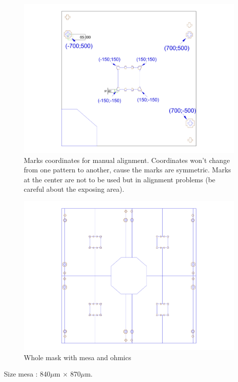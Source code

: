 \documentclass[12pt,a4paper]{report}
\begin{document}
\begin{enumerate}
\begin{figure} [h] \centering
\includegraphics[scale=0.6]{fig/DD_Dots_V6_with_coord.pdf}
\caption{Marks coordinates for manual alignment. Coordinates won't change from one pattern to another, cause 
the marks are symmetric. Marks at the center are not to be used but in alignment problems (be careful about the exposing area).} \label{align1}
\end{figure}

\newpage

\begin{figure} [ht] \centering
\includegraphics[scale=0.6]{fig/DD_Dots_V5_ebl_whole_mesa_ohmics.pdf}
\caption{Whole mask with mesa and ohmics} \label{align1}
\end{figure}

Size mesa : 840$\mu$m $\times$ 870$\mu$m. \\


\end{enumerate}
\end{document}
